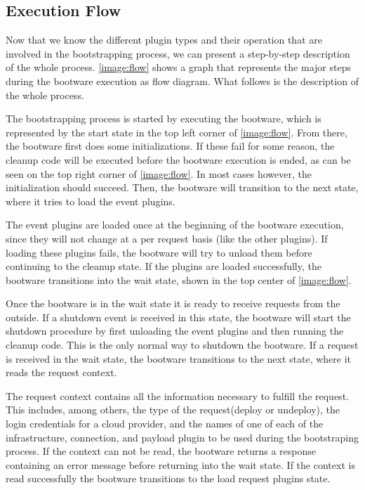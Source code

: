 \subsection{Execution Flow}
\label{flow}

Now that we know the different plugin types and their operation that are involved in the bootstrapping process, we can present a step-by-step description of the whole process.
\autoref{image:flow} shows a graph that represents the major steps during the bootware execution as flow diagram.
What follows is the description of the whole process.

The bootstrapping process is started by executing the bootware, which is represented by the start state in the top left corner of \autoref{image:flow}.
From there, the bootware first does some initializations.
If these fail for some reason, the cleanup code will be executed before the bootware execution is ended, as can be seen on the top right corner of \autoref{image:flow}.
In most cases however, the initialization should succeed.
Then, the bootware will transition to the next state, where it tries to load the event plugins.

The event plugins are loaded once at the beginning of the bootware execution, since they will not change at a per request basis (like the other plugins).
If loading these plugins fails, the bootware will try to unload them before continuing to the cleanup state.
If the plugins are loaded successfully, the bootware transitions into the wait state, shown in the top center of \autoref{image:flow}.

Once the bootware is in the wait state it is ready to receive requests from the outside.
If a shutdown event is received in this state, the bootware will start the shutdown procedure by first unloading the event plugins and then running the cleanup code.
This is the only normal way to shutdown the bootware.
If a request is received in the wait state, the bootware transitions to the next state, where it reads the request context.

The request context contains all the information necessary to fulfill the request.
This includes, among others, the type of the request(deploy or undeploy), the login credentials for a cloud provider, and the names of one of each of the infrastructure, connection, and payload plugin to be used during the bootstraping process.
If the context can not be read, the bootware returns a response containing an error message before returning into the wait state.
If the context is read successfully the bootware transitions to the load request plugins state.

